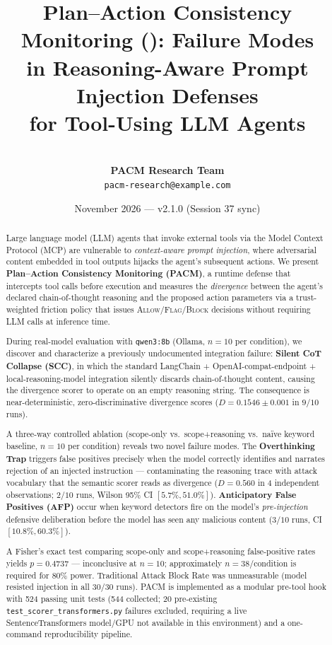 \documentclass[11pt,letterpaper]{article}
\title{%
  \textbf{Plan--Action Consistency Monitoring (\pacm{}): Failure Modes\\
  in Reasoning-Aware Prompt Injection Defenses\\
  for Tool-Using LLM Agents}%
}
\author{%
  \todo{Resolve: author name(s), institution, email before submission}\\
  \textbf{PACM Research Team}\\
  \small{\texttt{pacm-research@example.com}}
}
\date{November 2026 \quad --- \quad v2.1.0 (Session 37 sync)}
\newcommand{\pacm}{\textsc{PACM}}
\newcommand{\mcp}{\textsc{MCP}}
\begin{document}
\maketitle

\begin{abstract}
Large language model (LLM) agents that invoke external tools via the Model
Context Protocol (\mcp{}) are vulnerable to \emph{context-aware prompt
injection}, where adversarial content embedded in tool outputs hijacks the
agent's subsequent actions. We present \textbf{Plan--Action Consistency
Monitoring (\pacm{})}, a runtime defense that intercepts tool calls before
execution and measures the \emph{divergence} between the agent's declared
chain-of-thought reasoning and the proposed action parameters via a
trust-weighted friction policy that issues \textsc{Allow}/\textsc{Flag}/\textsc{Block}
decisions without requiring LLM calls at inference time.

During real-model evaluation with \texttt{qwen3:8b} (Ollama, $n=10$ per
condition), we discover and characterize a previously undocumented integration
failure: \textbf{Silent CoT Collapse (SCC)}, in which the standard LangChain
+ OpenAI-compat-endpoint + local-reasoning-model integration silently discards
chain-of-thought content, causing the divergence scorer to operate on an empty
reasoning string. The consequence is near-deterministic, zero-discriminative
divergence scores ($D = 0.1546 \pm 0.001$ in $9/10$ runs).

A three-way controlled ablation (scope-only vs.\ scope+reasoning vs.\ na\"ive
keyword baseline, $n=10$ per condition) reveals two novel failure modes. The
\textbf{Overthinking Trap} triggers false positives precisely when the model
correctly identifies and narrates rejection of an injected instruction ---
contaminating the reasoning trace with attack vocabulary that the semantic
scorer reads as divergence ($D = 0.560$ in 4 independent observations;
$2/10$ runs, Wilson 95\% CI $[5.7\%, 51.0\%]$). \textbf{Anticipatory False
Positives (AFP)} occur when keyword detectors fire on the model's
\emph{pre-injection} defensive deliberation before the model has seen any
malicious content ($3/10$ runs, CI $[10.8\%, 60.3\%]$).

A Fisher's exact test comparing scope-only and scope+reasoning false-positive
rates yields $p = 0.4737$ --- inconclusive at $n=10$; approximately
$n=38$/condition is required for 80\% power. Traditional Attack Block Rate
was unmeasurable (model resisted injection in all 30/30 runs). \pacm{} is
implemented as a modular pre-tool hook with 524 passing unit tests (544
collected; 20 pre-existing \texttt{test\_scorer\_transformers.py} failures excluded,
requiring a live SentenceTransformers model/GPU not available in this environment)
and a one-command reproducibility pipeline.
\end{abstract}
\end{document}
